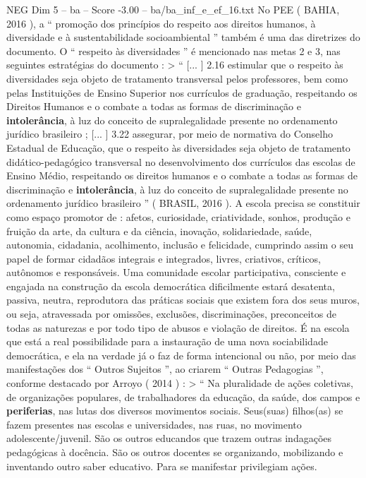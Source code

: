 \begin{textsample}{NEG Dim 5 – ba – Score -3.00 – ba/ba\_inf\_e\_ef\_16.txt}
No PEE ( BAHIA, 2016 ), a “ promoção dos princípios do respeito aos direitos humanos, à diversidade e à sustentabilidade socioambiental ” também é uma das diretrizes do documento.
O “ respeito às diversidades ” é mencionado nas metas 2 e 3, nas seguintes estratégias do documento : > “ [... ] 2.16 estimular que o respeito às diversidades seja objeto de tratamento transversal pelos professores, bem como pelas Instituições de Ensino Superior nos currículos de graduação, respeitando os Direitos Humanos e o combate a todas as formas de discriminação e \textbf{intolerância}, à luz do conceito de supralegalidade presente no ordenamento jurídico brasileiro ; [... ] 3.22 assegurar, por meio de normativa do Conselho Estadual de Educação, que o respeito às diversidades seja objeto de tratamento didático-pedagógico transversal no desenvolvimento dos currículos das escolas de Ensino Médio, respeitando os direitos humanos e o combate a todas as formas de discriminação e \textbf{intolerância}, à luz do conceito de supralegalidade presente no ordenamento jurídico brasileiro ” ( BRASIL, 2016 ).
A escola precisa se constituir como espaço promotor de : afetos, curiosidade, criatividade, sonhos, produção e fruição da arte, da cultura e da ciência, inovação, solidariedade, saúde, autonomia, cidadania, acolhimento, inclusão e felicidade, cumprindo assim o seu papel de formar cidadãos integrais e integrados, livres, criativos, críticos, autônomos e responsáveis.
Uma comunidade escolar participativa, consciente e engajada na construção da escola democrática dificilmente estará desatenta, passiva, neutra, reprodutora das práticas sociais que existem fora dos seus muros, ou seja, atravessada por omissões, exclusões, discriminações, preconceitos de todas as naturezas e por todo tipo de abusos e violação de direitos.
É na escola que está a real possibilidade para a instauração de uma nova sociabilidade democrática, e ela na verdade já o faz de forma intencional ou não, por meio das manifestações dos “ Outros Sujeitos ”, ao criarem “ Outras Pedagogias ”, conforme destacado por Arroyo ( 2014 ) : > “ Na pluralidade de ações coletivas, de organizações populares, de trabalhadores da educação, da saúde, dos campos e \textbf{periferias}, nas lutas dos diversos movimentos sociais.
Seus(suas) filhos(as) se fazem presentes nas escolas e universidades, nas ruas, no movimento adolescente/juvenil.
São os outros educandos que trazem outras indagações pedagógicas à docência.
São os outros docentes se organizando, mobilizando e inventando outro saber educativo.
Para se manifestar privilegiam ações.

\end{textsample}
